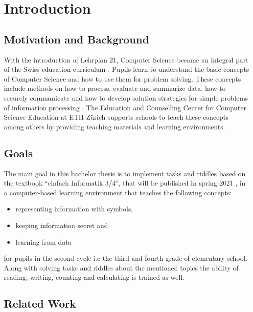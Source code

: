 \chapter{Introduction}

\section{Motivation and Background}

With the introduction of Lehrplan 21, Computer Science became an integral part of the Swiss education curriculum \cite{Lehrplan21}. Pupils learn to understand the basic concepts of Computer Science and how to use them for problem solving. These concepts include methods on how to process, evaluate and summarize data, how to securely communicate and how to develop solution strategies for simple problems of information processing \cite{MedienUndInformatik}. The Education and Counselling Center for Computer Science Education at ETH Zürich \cite{ABZ} supports schools to teach these concepts among others by providing teaching materials and learning environments.

\section{Goals}

The main goal in this bachelor thesis is to implement tasks and riddles based on the textbook “einfach Informatik 3/4”, that will be published in spring 2021 \cite{EinfachInformatik}, in a computer-based learning environment that teaches the following concepts:

\begin{itemize}
    \item representing information with symbols,
    \item keeping information secret and
    \item learning from data
\end{itemize}

for pupils in the second cycle i.e the third and fourth grade of elementary school.
Along with solving tasks and riddles about the mentioned topics the ability of reading, writing, counting and calculating is trained as well.

\section{Related Work}



